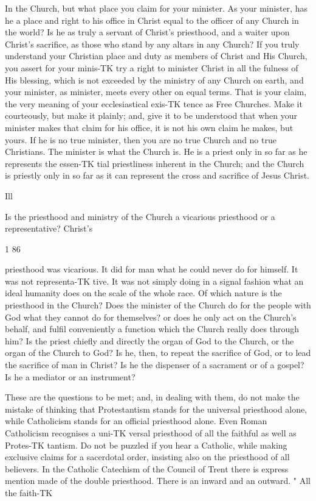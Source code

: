 \documentclass[12pt,a5paper,twoside]{book}
\begin{document}
{In the Church, but what place you claim for your 
minister. As your minister, has he a place and right 
to his office in Christ equal to the officer of any Church 
in the world? Is he as truly a servant of Christ's 
priesthood, and a waiter upon Christ's sacrifice, as those 
who stand by any altars in any Church? If you truly 
understand your Christian place and duty as members 
of Christ and His Church, you assert for your minis-TK
try a right to minister Christ in all the fulness of 
His blessing, which is not exceeded by the ministry 
of any Church on earth, and your minister, as minister, 
meets every other on equal terms. That is your 
claim, the very meaning of your ecclesiastical exis-TK
tence as Free Churches. Make it courteously, but 
make it plainly; and, give it to be understood that 
when your minister makes that claim for his office, it 
is not his own claim he makes, but yours. If he is 
no true minister, then you are no true Church and no 
true Christians. The minister is what the Church is. 
He is a priest only in so far as he represents the essen-TK
tial priestliness inherent in the Church; and the 
Church is priestly only in so far as it can represent 
the cross and sacrifice of Jesus Christ. 

Ill 

Is the priesthood and ministry of the Church a 
vicarious priesthood or a representative? Christ's 



1 86 

priesthood was vicarious. It did for man what he 
could never do for himself. It was not representa-TK
tive. It was not simply doing in a signal fashion what 
an ideal humanity does on the scale of the whole race. 
Of which nature is the priesthood in the Church? 
Does the minister of the Church do for the people 
with God what they cannot do for themselves? or 
does he only act on the Church's behalf, and fulfil 
conveniently a function which the Church really does 
through him? Is the priest chiefly and directly the 
organ of God to the Church, or the organ of the 
Church to God? Is he, then, to repeat the sacrifice 
of God, or to lead the sacrifice of man in Christ? Is 
he the dispenser of a sacrament or of a gospel? Is 
he a mediator or an instrument? 

These are the questions to be met; and, in dealing 
with them, do not make the mistake of thinking that 
Protestantism stands for the universal priesthood alone, 
while Catholicism stands for an official priesthood 
alone. Even Roman Catholicism recognises a uni-TK
versal priesthood of all the faithful as well as Protes-TK
tantism. Do not be puzzled if you hear a Catholic, 
while making exclusive claims for a sacerdotal order, 
insisting also on the priesthood of all believers. In 
the Catholic Catechism of the Council of Trent there 
is express mention made of the double priesthood. 
There is an inward and an outward. " All the faith-TK



}
\end{document}

